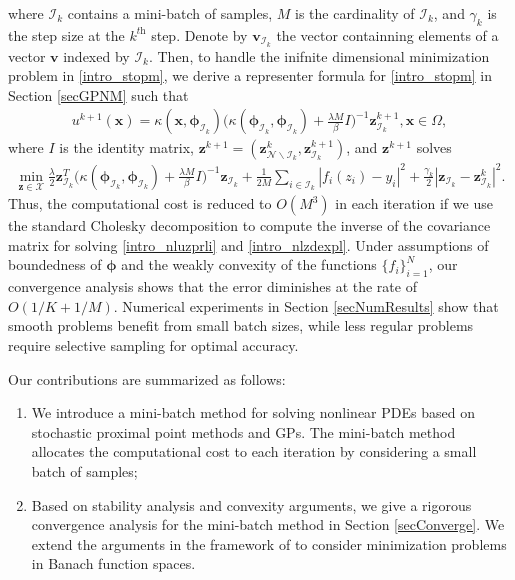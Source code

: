 \documentclass[10pt,reqno]{amsart}
\newcommand{\1}{{\chi}}
\numberwithin{equation}{section}
\theoremstyle{thmlemcorr}
\numberwithin{theorem}{section}
\theoremstyle{thmlemcorr*}
\theoremstyle{defi}
\theoremstyle{remexample}
\theoremstyle{ass}
\begin{document}
where $\mathcal{I}_k$ contains a mini-batch of samples, $M$ is the cardinality of $\mathcal{I}_k$, and $\gamma_k$ is the step size at the $k^{\textit{th}}$ step. Denote by $\boldsymbol{v}_{\mathcal{I}_k}$ the vector containning elements of a vector $\boldsymbol{v}$ indexed by $\mathcal{I}_k$. Then, to handle the inifnite dimensional minimization problem in \eqref{intro_stopm}, we derive a representer formula for \eqref{intro_stopm} in Section \ref{secGPNM} such that 
\begin{align}
	\label{intro_nluzprli}
	u^{k+1}(\boldsymbol{x})=\kappa(\boldsymbol{x}, \boldsymbol{\phi}_{\mathcal{I}_k})\bigg(\kappa(\boldsymbol{\phi}_{\mathcal{I}_k}, \boldsymbol{\phi}_{\mathcal{I}_k}) + \frac{\lambda M}{\beta}{I} \bigg)^{-1}\boldsymbol{z}^{k+1}_{\mathcal{I}_k}, \boldsymbol{x} \in \Omega, 
\end{align}
where ${I}$ is the identity matrix,  $\boldsymbol{z}^{k+1}=(\boldsymbol{z}^{k}_{\mathcal{N}\backslash\mathcal{I}_k}, \boldsymbol{z}^{k+1}_{\mathcal{I}_k})$, and  $\boldsymbol{z}^{k+1}$ solves
\begin{align}
	\label{intro_nlzdexpl}
	\min_{\boldsymbol{z} \in \mathcal{X}}\frac{\lambda}{2}\boldsymbol{z}^T_{\mathcal{I}_k}\bigg(\kappa(\boldsymbol{\phi}_{\mathcal{I}_k}, \boldsymbol{\phi}_{\mathcal{I}_k})
	+ \frac{\lambda M}{\beta}I\bigg)^{-1}\boldsymbol{z}_{\mathcal{I}_k}
	 + \frac{1}{2M}\sum_{i\in \mathcal{I}_k}|f_i(z_i) - y_i|^2 +  \frac{\gamma_{k}}{2}|\boldsymbol{z}_{\mathcal{I}_k}-{\boldsymbol{z}}_{\mathcal{I}_k}^{k}|^2.  
\end{align}
Thus, the computational cost is reduced to $O(M^3)$ in each iteration if we use the standard Cholesky decomposition to compute the inverse of the covariance matrix for solving \eqref{intro_nluzprli} and \eqref{intro_nlzdexpl}. Under assumptions of boundedness of  $\boldsymbol{\phi}$ and the weakly convexity of the functions $\{f_i\}_{i=1}^N$, our convergence analysis shows that the error diminishes at the rate of $O(1/K + 1/M)$. Numerical experiments in Section \ref{secNumResults} show that smooth problems benefit from small batch sizes, while less regular problems require selective sampling for optimal accuracy.

Our contributions are summarized as follows:
\begin{enumerate}
	\item We introduce a mini-batch method for solving nonlinear PDEs based on stochastic proximal point methods and GPs. The mini-batch method allocates the computational cost to each iteration by considering a small batch of samples;
	\item  Based on stability analysis and convexity arguments, we give a rigorous convergence analysis for the mini-batch method in Section \ref{secConverge}. We extend the arguments in the framework of \cite{davis2019stochastic, bousquet2002stability, deng2021minibatch} to consider minimization problems in Banach function spaces.  
\end{enumerate}
\end{document}
